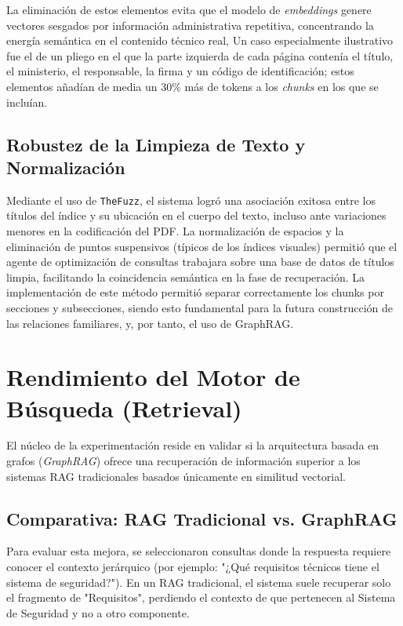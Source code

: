 La eliminación de estos elementos evita que el modelo de \textit{embeddings} genere vectores sesgados por información administrativa repetitiva, concentrando la energía semántica en el contenido técnico real, Un caso especialmente ilustrativo fue el de un pliego en el que la parte izquierda de cada página contenía el título, el ministerio, el responsable, la firma y un código de identificación; estos elementos añadían de media un 30\% más de tokens a los \textit{chunks} en los que se incluían.

\subsection{Robustez de la Limpieza de Texto y Normalización}
Mediante el uso de \texttt{TheFuzz}, el sistema logró una asociación exitosa entre los títulos del índice y su ubicación en el cuerpo del texto, incluso ante variaciones menores en la codificación del PDF. La normalización de espacios y la eliminación de puntos suspensivos (típicos de los índices visuales) permitió que el agente de optimización de consultas trabajara sobre una base de datos de títulos limpia, facilitando la coincidencia semántica en la fase de recuperación.
La implementación de este método permitió separar correctamente los chunks por secciones y subsecciones, siendo esto fundamental para la futura construcción de las relaciones familiares, y, por tanto, el uso de GraphRAG.

\section{Rendimiento del Motor de Búsqueda (Retrieval)}

El núcleo de la experimentación reside en validar si la arquitectura basada en grafos (\textit{GraphRAG}) ofrece una recuperación de información superior a los sistemas RAG tradicionales basados únicamente en similitud vectorial.

\subsection{Comparativa: RAG Tradicional vs. GraphRAG}
Para evaluar esta mejora, se seleccionaron consultas donde la respuesta requiere conocer el contexto jerárquico (por ejemplo: "¿Qué requisitos técnicos tiene el sistema de seguridad?"). En un RAG tradicional, el sistema suele recuperar solo el fragmento de "Requisitos", perdiendo el contexto de que pertenecen al Sistema de Seguridad y no a otro componente.

